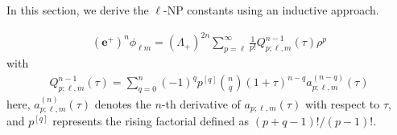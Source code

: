 \noindent
In this section, we derive the $\ell$-NP constants using an inductive approach.
\begin{proposition}\label{lemmaMainNPplus}
  \begin{align}\label{eq:bmelplusonephilm}
    (\boldsymbol{e}^{+})^{n}\phi_{\ell m} = (\Lambda_{+})^{2n}\sum_{p=\ell}^{\infty}\frac{1}{p!}Q^{n-1}_{p;\ell,m}(\tau)\rho^{p}
  \end{align}
  with
  \begin{align}\label{eq:Qn}
    Q^{n-1}_{p;\ell,m}(\tau)= \sum_{q=0}^{n}(-1)^q p^{[q]} {n \choose q}(1+\tau)^{n-q}a_{p;\ell,m}^{(n-q)}(\tau)
  \end{align}
  here, $a_{p;\ell,m}^{(n)}(\tau)$ denotes the $n$-th derivative of $a_{p;\ell,m}(\tau)$ with respect to $\tau$, and $p^{[q]}$ represents the rising factorial defined as $(p+q-1)!/(p-1)!$.
\end{proposition}
